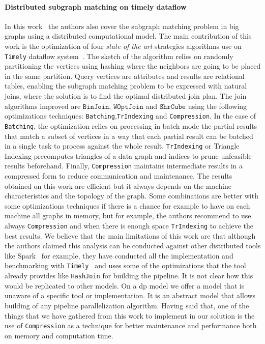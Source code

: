 \paragraph{Distributed subgraph matching on timely dataflow} In this work~\cite{Lai} the authors also cover the subgraph matching problem in big graphs using a distributed computational model. 
The main contribution of this work is the optimization of four \emph{state of the art} strategies algorithms use on \texttt{Timely} dataflow system~\cite{timelyflow}. 
The sketch of the algorithm relies on randomly partitioning the vertices using hashing where the neighbors are going to be placed in the same partition.
Query vertices are attributes and results are relational tables, enabling the subgraph matching problem to be expressed with natural joins, where the solution is to find the optimal distributed join plan.
The join algorithms improved are $\mathtt{BinJoin}$, $\mathtt{WOptJoin}$ and $\mathtt{ShrCube}$ using the following optimizations techniques: \texttt{Batching},\texttt{TrIndexing} and \texttt{Compression}.
In the case of \texttt{Batching}, the optimization relies on processing in batch mode the partial results that match a subset of vertices in a way that each partial result can be batched in a single task to process against the whole result.
\texttt{TrIndexing} or Triangle Indexing precomputes triangles of a data graph and indices to prune unfeasible results beforehand. Finally, \texttt{Compression} maintains intermediate results in a compressed form to reduce communication and maintenance. 
The results obtained on this work are efficient but it always depends on the machine characteristics and the topology of the graph. Some combinations are better with some optimizations techniques if there is a chance for example to have on each machine all graphs in memory, but for example, the authors recommend to use always \texttt{Compression} and when there is enough space \texttt{TrIndexing} to achieve the best results. 
We believe that the main limitations of this work are that although the authors claimed this analysis can be conducted against other distributed tools like Spark~\cite{apachespark} for example, they have conducted all the implementation and benchmarking with
\texttt{Timely}~\cite{timelyflow} and uses some of the optimizations that the tool already provides like \texttt{HashJoin} for building the pipeline. It is not clear how this would be replicated to other models.
On a \acrshort{dp} model we offer a model that is unaware of a specific tool or implementation. It is an abstract model that allows building of any pipeline parallelization algorithm.
Having said that, one of the things that we have gathered from this work to implement in our solution is the use of \texttt{Compression} as a technique for better maintenance and performance both on memory and computation time.


